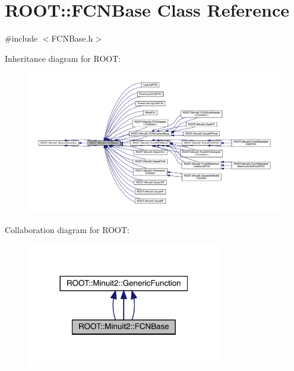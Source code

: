 \hypertarget{classROOT_1_1Minuit2_1_1FCNBase}{}\section{R\+O\+OT\+:\+:F\+C\+N\+Base Class Reference}
\label{classROOT_1_1Minuit2_1_1FCNBase}


{\ttfamily \#include $<$F\+C\+N\+Base.\+h$>$}



Inheritance diagram for R\+O\+OT\+:
\nopagebreak
\begin{figure}[H]
\begin{center}
\leavevmode
\includegraphics[width=350pt]{d7/dcb/classROOT_1_1Minuit2_1_1FCNBase__inherit__graph}
\end{center}
\end{figure}


Collaboration diagram for R\+O\+OT\+:
\nopagebreak
\begin{figure}[H]
\begin{center}
\leavevmode
\includegraphics[width=240pt]{d9/d0f/classROOT_1_1Minuit2_1_1FCNBase__coll__graph}
\end{center}
\end{figure}
